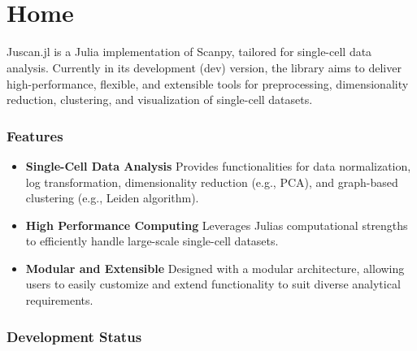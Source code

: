 \documentclass[oneside]{memoir}
\title{
    {\HUGE \DocMainTitle }\\
    {\Large \DocVersion }
}
\author{ \DocAuthors }
\begin{document}
\frontmatter
\maketitle
\clearpage
\tableofcontents

\mainmatter

\newcommand{\DocMainTitle}{Juscan.jl}
\newcommand{\DocVersion}{}
\newcommand{\DocAuthors}{lihuax(LiZehua)}
\newcommand{\JuliaVersion}{1.11.3}

% 


\part{Home}


Juscan.jl is a Julia implementation of Scanpy, tailored for single-cell data analysis. Currently in its development (dev) version, the library aims to deliver high-performance, flexible, and extensible tools for preprocessing, dimensionality reduction, clustering, and visualization of single-cell datasets.



\section{Features}



\label{7269310191258299096}{}


\begin{itemize}
\item \textbf{Single-Cell Data Analysis}   Provides functionalities for data normalization, log transformation, dimensionality reduction (e.g., PCA), and graph-based clustering (e.g., Leiden algorithm).


\item \textbf{High Performance Computing}   Leverages Julia{\textquotesingle}s computational strengths to efficiently handle large-scale single-cell datasets.


\item \textbf{Modular and Extensible}   Designed with a modular architecture, allowing users to easily customize and extend functionality to suit diverse analytical requirements.

\end{itemize}


\section{Development Status}
\end{document}
